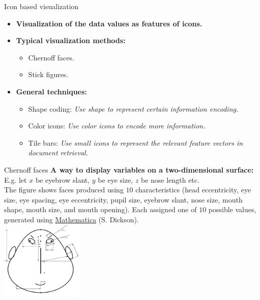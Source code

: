 \documentclass[aspectratio=169,t]{beamer}
\begin{document}
  { 
    \begin{frame}{Icon based visualization}
    \centering
    \begin{itemize}
      \item \textbf{Visualization of the data values as features of icons.}
      \item \textbf{Typical visualization methods:}
      \begin{itemize}
        \item Chernoff faces.
        \item Stick figures.
      \end{itemize}
      \item \textbf{General techniques:}
      \begin{itemize}
        \item Shape coding: \emph{Use shape to represent certain information encoding.}
        \item Color icons: \emph{Use color icons to encode more information.}
        \item Tile bars: \emph{Use small icons to represent the relevant feature vectors in document retrieval.}
      \end{itemize}
    \end{itemize}
    \end{frame}
  }

  { 
    \begin{frame}{Chernoff faces}
    \textbf{A way to display variables on a two-dimensional surface:}\\
    E.g. let $x$ be eyebrow slant, $y$ be eye size, $z$ be nose length etc.\\
    The figure shows faces produced using $10$ characteristics (head eccentricity, eye size, eye spacing, eye eccentricity, pupil size, eyebrow slant, nose size, mouth shape, mouth size, and mouth opening). Each assigned one of $10$ possible values, generated using \href{https://www.wolfram.com/mathematica/}{Mathematica} (S. Dickson).\\[0.5cm]
    \centering
    \includegraphics[width=4cm]{img/chernoff_faces_construction.pdf}
    \end{frame}
  }
\end{document}

